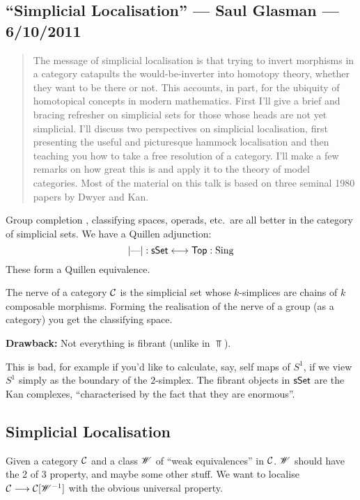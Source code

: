 \documentclass[11pt]{article}
\newcommand{\KanSemResponse}[1]
{
\thispagestyle{fancy}
\subsection*{#1}
}
\begin{document}
\begin{SaulSimplicialLocalisation}
\KanSemResponse
{``Simplicial Localisation'' --- Saul Glasman --- 6/10/2011}
\begin{abstract}
The message of simplicial localisation is that trying to invert 
morphisms in a category catapults the would-be-inverter into homotopy 
theory, whether they want to be there or not. This accounts, in part, 
for the ubiquity of homotopical concepts in modern mathematics. First 
I'll give a brief and bracing refresher on simplicial sets for those 
whose heads are not yet simplicial. I'll discuss two perspectives on 
simplicial localisation, first presenting the useful and picturesque 
hammock localisation and then teaching you how to take a free resolution 
of a category. I'll make a few remarks on how great this is and apply it 
to the theory of model categories. Most of the material on this talk is 
based on three seminal 1980 papers by Dwyer and Kan.
\end{abstract}
Group completion , classifying spaces, operads, etc.\ are all better in the category of simplicial sets. We have a Quillen adjunction:
\[|\textup{---}|:\operatorname{{\mathsf{sSet}}}\longleftrightarrow\operatorname{{\mathsf{Top}}}:\operatorname{Sing}\]
These form a Quillen equivalence.
\begin{exmp*}
The nerve of a category $\mathcal{C}$ is the simplicial set whose $k$-simplices are chains of $k$ composable morphisms. Forming the realisation of the nerve of a group (as a category) you get the classifying space.
\end{exmp*}
\textbf{Drawback:} Not everything is fibrant (unlike in $\Top$).

This is bad, for example if you'd like to calculate, say, self maps of $S^1$, if we view $S^1$ simply as the boundary of the $2$-simplex.
The fibrant objects in $\operatorname{{\mathsf{sSet}}}$ are the Kan complexes, ``characterised by the fact that they are enormous''.
\subsection*{Simplicial Localisation}
Given a category $\mathcal{C}$ and a class $\mathscr{W}$ of ``weak equivalences'' in $\mathcal{C}$. $\mathscr{W}$ should have the 2 of 3 property, and maybe some other stuff. We want to localise $\mathcal{C}\longrightarrow\mathcal{C}[\mathscr{W}^{-1}]$ with the obvious universal property.


\end{SaulSimplicialLocalisation}
\end{document}
